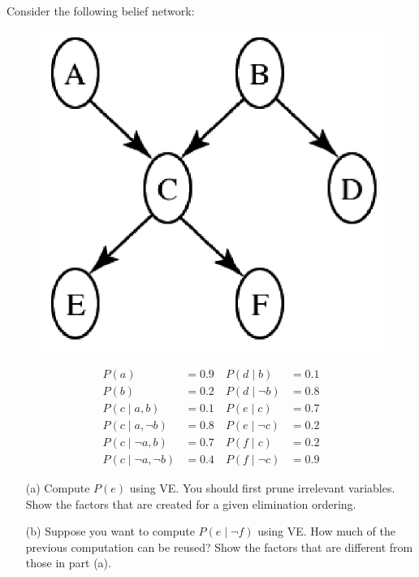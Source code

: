 \documentclass[a4paper, 11pt]{article}
\begin{document}
\begin{question}\normalfont
Consider the following belief network:

\begin{minipage}{0.5\linewidth}
\begin{figure}[H]
\centering
\includegraphics[width=0.6\linewidth]{fig/Q4.png}
\end{figure}
\end{minipage}
\begin{minipage}{0.5\linewidth}
\[\begin{aligned}
P(a) &=0.9 \quad P(d \mid b) &=0.1 \\
P(b) &=0.2 \quad P(d \mid \neg b)&=0.8 \\
P(c \mid a, b) &=0.1 \quad P(e \mid c)&=0.7 \\
P(c \mid a,\neg b) &=0.8 \quad P(e \mid \neg c)&=0.2 \\
P(c \mid \neg a, b) &=0.7 \quad P(f \mid c)&= 0.2 \\
P(c \mid \neg a, \neg b) &=0.4 \quad P(f \mid \neg c)&= 0.9
\end{aligned}\]
\end{minipage}
\begin{itemize}
    \item [(a)] Compute $P(e)$ using VE. You should first prune irrelevant variables. Show the factors that are created for a given elimination ordering.
    \item [(b)] Suppose you want to compute $P(e\mid\lnot f)$ using VE. How much of the previous computation can be reused? Show the factors that are different from those in part (a).
\end{itemize}
\end{question}
\end{document}
